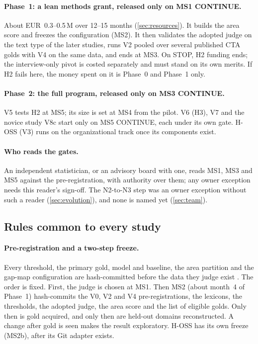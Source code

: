 \paragraph{Phase~1: a lean methods grant, released only on MS1 CONTINUE.} About EUR~0.3--0.5\,M
over 12--15 months (\cref{sec:resources}). It builds the area score and freezes the
configuration (MS2). It then validates the adopted judge on the text type of the later studies,
runs V2 pooled over several published CTA golds with V4 on the same data, and ends at MS3. On STOP, H2 funding ends; the
interview-only pivot is costed separately and must stand on its own merits. If H2 fails here, the
money spent on it is Phase~0 and Phase~1 only.

\paragraph{Phase~2: the full program, released only on MS3 CONTINUE.} V5 tests H2 at MS5; its size
is set at MS4 from the pilot. V6 (H3), V7 and the novice study V8c start only on MS5
CONTINUE, each under its own gate. H-OSS (V3) runs on the organizational track once its
components exist.

\paragraph{Who reads the gates.} An independent statistician, or an advisory board with one, reads
MS1, MS3 and MS5 against the pre-registration, with authority over them; any owner exception needs
this reader's sign-off. \evobs{} The N2-to-N3 step was an owner exception without such a reader
(\cref{sec:evolution}), and none is named yet (\cref{sec:team}).

\subsection{Rules common to every study}

\paragraph{Pre-registration and a two-step freeze.} \evfut{} Every threshold, the primary gold,
model and baseline, the area partition and the gap-map configuration are hash-committed before the
data they judge exist \parencite{nosek2018preregistration}. The order is fixed. First, the judge is
chosen at MS1. Then MS2 (about month~4 of Phase~1) hash-commits the V0, V2 and V4
pre-registrations, the lexicons, the thresholds, the adopted judge, the area score and the list of
eligible golds. Only then is gold acquired, and only then are held-out domains reconstructed. A
change after gold is seen makes the result exploratory. H-OSS has its own freeze (MS2b), after its
Git adapter exists.


